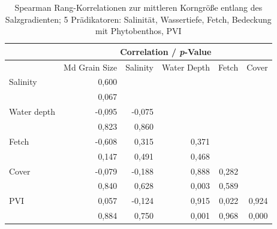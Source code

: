 \begin{table}[!htb]
\centering
\caption[Spearman Rang-Korrelationen zur mittleren Korngröße entlang des Salzgradienten]{Spearman Rang-Korrelationen zur mittleren Korngröße entlang des Salzgradienten; 5 Prädikatoren: Salinität, Wassertiefe, Fetch, Bedeckung mit Phytobenthos, PVI}
\begin{tabular}{lrrrrr}

\toprule
& \multicolumn{5}{c}{Correlation / \textit{p}-Value} \\
\midrule
& \multicolumn{1}{c}{Md Grain Size}  & \multicolumn{1}{c}{Salinity} & \multicolumn{1}{c}{Water Depth} & \multicolumn{1}{c}{Fetch} & \multicolumn{1}{c}{Cover} \\

\midrule

Salinity        &       0,600\\
                &       0,067\\
\midrule
Water depth	    &     	-0,095           &-0,075\\
                &     	0,823            &0,860\\
\midrule
Fetch  	        &   	-0,608           &0,315            &0,371 \\
                &   	0,147            &0,491            &0,468 \\
\midrule
Cover  	        &     	-0,079           &-0,188           &0,888 		&0,282\\
                &     	0,840            &0,628            &0,003 		&0,589\\
\midrule
PVI	            &     	0,057            &-0,124           &0,915			&0,022            &0,924\\
                &     	0,884            &0,750            &0,001			&0,968            &0,000\\                    
\bottomrule

\end{tabular}
\label{tab:spearman_rank_correlations}
\end{table}



